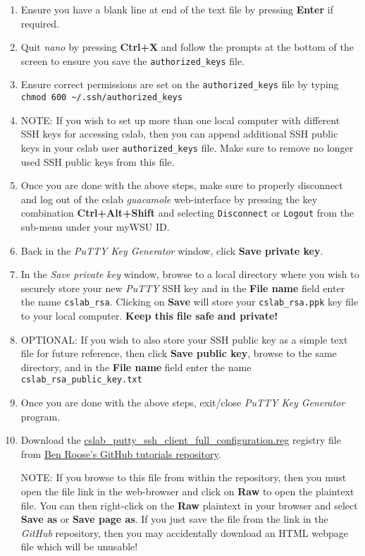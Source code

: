 \documentclass[12pt]{article}
\begin{document}
\begin{flushleft}
\begin{enumerate}
  \item Ensure you have a blank line at end of the text file by pressing \textbf{Enter} if required.
  \item Quit \textit{nano} by pressing \textbf{Ctrl+X} and follow the prompts at the bottom of the screen to ensure you save the \verb|authorized_keys| file.
  \item Ensure correct permissions are set on the \verb|authorized_keys| file by typing \break
    \verb|chmod 600 ~/.ssh/authorized_keys|
  \item NOTE: If you wish to set up more than one local computer with different SSH keys for accessing cslab, then you can append additional SSH public keys in your cslab user \verb|authorized_keys| file. Make sure to remove no longer used SSH public keys from this file.
  \item Once you are done with the above steps, make sure to properly disconnect and log out of the cslab \textit{guacamole} web-interface by pressing the key combination \textbf{Ctrl+Alt+Shift} and selecting \texttt{Disconnect} or \texttt{Logout} from the sub-menu under your myWSU ID.
  \item Back in the \textit{PuTTY Key Generator} window, click \textbf{Save private key}.
  \item In the \textit{Save private key} window, browse to a local directory where you wish to securely store your new \textit{PuTTY} SSH key and in the \textbf{File name} field enter the name \verb|cslab_rsa|. Clicking on \textbf{Save} will store your \verb|cslab_rsa.ppk| key file to your local computer. \textbf{Keep this file safe and private!}
  \item OPTIONAL: If you wish to also store your SSH public key as a simple text file for future reference, then click \textbf{Save public key}, browse to the same directory, and in the \textbf{File name} field enter the name \verb|cslab_rsa_public_key.txt|
  \item Once you are done with the above steps, exit/close \textit{PuTTY Key Generator} program.
  \item Download the \href{https://raw.githubusercontent.com/benroose/tutorials/master/cslab_tutorials/cslab_ssh_client_config_files/cslab_putty_ssh_client_full_configuration.reg}{cslab\_putty\_ssh\_client\_full\_configuration.reg} registry file from \href{https://github.com/benroose/tutorials/tree/master/cslab_tutorials/}{Ben Roose's GitHub tutorials repository}.

   NOTE: If you browse to this file from within the repository, then you must open the file link in the web-browser and click on \textbf{Raw} to open the plaintext file. You can then right-click on the \textbf{Raw} plaintext in your browser and select \textbf{Save as} or \textbf{Save page as}. If you just save the file from the link in the \textit{GitHub} repository, then you may accidentally download an HTML webpage file which will be unusable!
    

\end{enumerate}
\end{flushleft}
\end{document}
